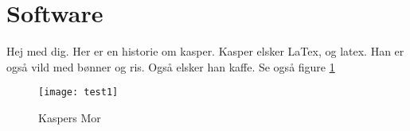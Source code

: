 \documentclass[Main]{subfiles}
\begin{document}
\section{Software} %
\label{sec:software}

Hej med dig.
Her er en historie om kasper.
Kasper elsker LaTex, og latex.
Han er også vild med bønner og ris.
Også elsker han kaffe. 
Se også figure \ref{fig:testimage}

\begin{figure}[H]
	\centering
	\texttt{[image: test1]}
	\caption{Kaspers Mor}
	\label{fig:testimage}
\end{figure}

\end{document}
